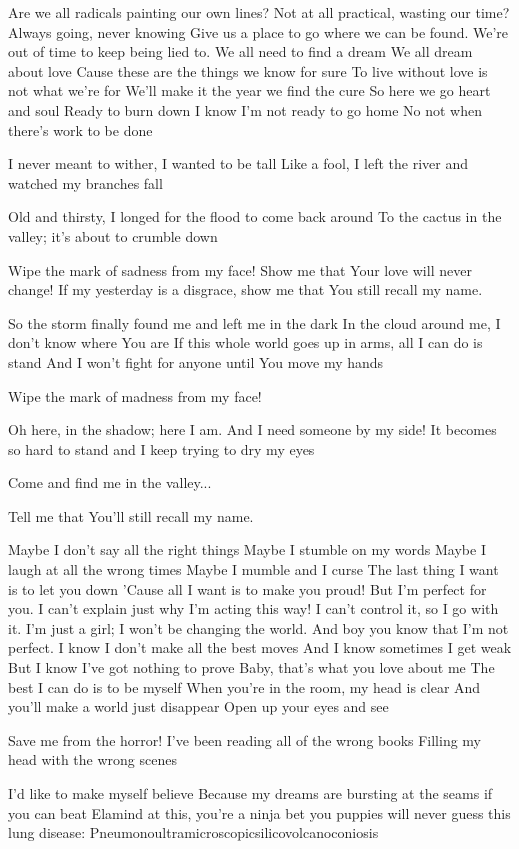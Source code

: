 Are we all radicals painting our own lines?
Not at all practical, wasting our time?
Always going, never knowing
Give us a place to go where we can be found.
We're out of time to keep being lied to.
We all need to find a dream
We all dream about love
Cause these are the things we know for sure
To live without love is not what we're for
We'll make it the year we find the cure
So here we go heart and soul
Ready to burn down
I know I'm not ready to go home
No not when there's work to be done


I never meant to wither, I wanted to be tall
Like a fool, I left the river and watched my branches fall

Old and thirsty, I longed for the flood to come back around
To the cactus in the valley; it's about to crumble down

Wipe the mark of sadness from my face!
Show me that Your love will never change!
If my yesterday is a disgrace, show me that You still recall my name.

So the storm finally found me and left me in the dark
In the cloud around me, I don’t know where You are
If this whole world goes up in arms, all I can do is stand
And I won’t fight for anyone until You move my hands

Wipe the mark of madness from my face!

Oh here, in the shadow; here I am.
And I need someone by my side!
It becomes so hard to stand and I keep trying to dry my eyes

Come and find me in the valley...

Tell me that You'll still recall my name.


Maybe I don't say all the right things
Maybe I stumble on my words
Maybe I laugh at all the wrong times
Maybe I mumble and I curse
The last thing I want is to let you down
'Cause all I want is to make you proud!
But I'm perfect for you.
I can't explain just why I'm acting this way!
I can't control it, so I go with it.
I'm just a girl; I won't be changing the world.
And boy you know that I'm not perfect.
I know I don't make all the best moves
And I know sometimes I get weak
But I know I've got nothing to prove
Baby, that's what you love about me
The best I can do is to be myself
When you're in the room, my head is clear
And you'll make a world just disappear
Open up your eyes and see


Save me from the horror!
I've been reading all of the wrong books
Filling my head with the wrong scenes


I'd like to make myself believe
Because my dreams are bursting at the seams
if you can beat Elamind at this, you're a ninja
bet you puppies will never guess this lung disease: Pneumonoultramicroscopicsilicovolcanoconiosis

